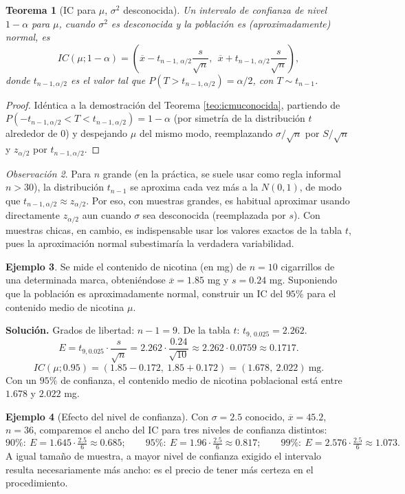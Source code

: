\documentclass[11pt,a4paper]{article}
\theoremstyle{plain}
\newtheorem{teorema}{Teorema}[section]
\theoremstyle{definition}
\newtheorem{ejemplo}[teorema]{Ejemplo}
\theoremstyle{remark}
\newtheorem{observacion}[teorema]{Observación}
\begin{document}
\begin{teorema}[IC para $\mu$, $\sigma^2$ desconocida]
Un intervalo de confianza de nivel $1-\alpha$ para $\mu$, cuando $\sigma^2$ es desconocida y la población es (aproximadamente) normal, es
\[
IC(\mu;1-\alpha) = \left(\overline x - t_{n-1,\,\alpha/2}\frac{s}{\sqrt n},\ \ \overline x+t_{n-1,\,\alpha/2}\frac{s}{\sqrt n}\right),
\]
donde $t_{n-1,\alpha/2}$ es el valor tal que $P(T>t_{n-1,\alpha/2})=\alpha/2$, con $T\sim t_{n-1}$.
\end{teorema}

\begin{proof}
Idéntica a la demostración del Teorema \ref{teo:icmuconocida}, partiendo de $P(-t_{n-1,\alpha/2}<T<t_{n-1,\alpha/2})=1-\alpha$ (por simetría de la distribución $t$ alrededor de $0$) y despejando $\mu$ del mismo modo, reemplazando $\sigma/\sqrt n$ por $S/\sqrt n$ y $z_{\alpha/2}$ por $t_{n-1,\alpha/2}$.
\end{proof}

\begin{observacion}
Para $n$ grande (en la práctica, se suele usar como regla informal $n>30$), la distribución $t_{n-1}$ se aproxima cada vez más a la $N(0,1)$, de modo que $t_{n-1,\alpha/2}\approx z_{\alpha/2}$. Por eso, con muestras grandes, es habitual aproximar usando directamente $z_{\alpha/2}$ aun cuando $\sigma$ sea desconocida (reemplazada por $s$). Con muestras chicas, en cambio, es indispensable usar los valores exactos de la tabla $t$, pues la aproximación normal subestimaría la verdadera variabilidad.
\end{observacion}

\begin{ejemplo}
Se mide el contenido de nicotina (en mg) de $n=10$ cigarrillos de una determinada marca, obteniéndose $\overline x=1.85$ mg y $s=0.24$ mg. Suponiendo que la población es aproximadamente normal, construir un IC del $95\%$ para el contenido medio de nicotina $\mu$.

\textbf{Solución.} Grados de libertad: $n-1=9$. De la tabla $t$: $t_{9,\,0.025}=2.262$.
\[
E = t_{9,0.025}\cdot\frac{s}{\sqrt n} = 2.262\cdot\frac{0.24}{\sqrt{10}} \approx 2.262\cdot 0.0759 \approx 0.1717.
\]
\[
IC(\mu;0.95) = (1.85-0.172,\ 1.85+0.172) = (1.678,\ 2.022)\ \text{mg.}
\]
Con un $95\%$ de confianza, el contenido medio de nicotina poblacional está entre $1.678$ y $2.022$ mg.
\end{ejemplo}

\begin{ejemplo}[Efecto del nivel de confianza]
Con $\sigma=2.5$ conocido, $\overline x=45.2$, $n=36$, comparemos el ancho del IC para tres niveles de confianza distintos:
\[
90\%:\ E=1.645\cdot\tfrac{2.5}{6}\approx 0.685; \qquad 95\%:\ E=1.96\cdot\tfrac{2.5}{6}\approx 0.817; \qquad 99\%:\ E=2.576\cdot\tfrac{2.5}{6}\approx 1.073.
\]
A igual tamaño de muestra, a mayor nivel de confianza exigido el intervalo resulta necesariamente más ancho: es el precio de tener más certeza en el procedimiento.
\end{ejemplo}
\end{document}
